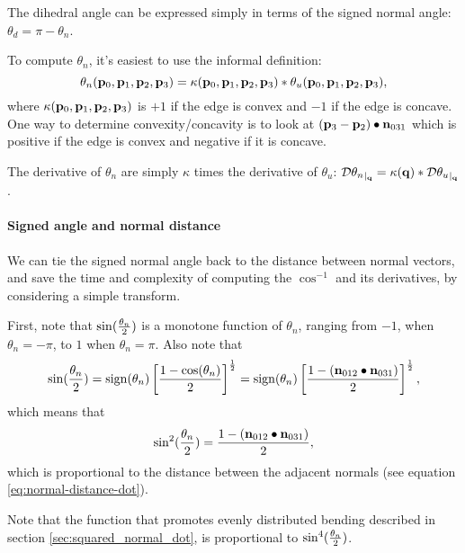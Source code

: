 The dihedral angle can be expressed simply in terms of the
signed normal angle: $\theta_d = \pi - \theta_n$.

To compute $\theta_n$,
it's easiest to use the informal definition:
\begin{equation}
\theta_n({\mathbf p}_0,{\mathbf p}_1,{\mathbf p}_2,{\mathbf p}_3)
= \kappa({\mathbf p}_0,{\mathbf p}_1,{\mathbf p}_2,{\mathbf p}_3) \ast \theta_u({\mathbf p}_0,{\mathbf p}_1,{\mathbf p}_2,{\mathbf p}_3),
\end{equation}
where $\kappa({\mathbf p}_0,{\mathbf p}_1,{\mathbf p}_2,{\mathbf p}_3)$ is
$+1$ if the edge is convex
and
$-1$ if the edge is concave.
One way to determine convexity/concavity
is to look at
$\left({\mathbf p}_3 - {\mathbf p}_2 \right) \bullet {\mathbf n}_{031}$
which is positive if the edge is convex
and negative if it is concave.

The derivative of $\theta_n$ are simply $\kappa$
times the derivative of $\theta_u$:
${\mathcal{D}{\theta_n}_{\mid_{{\mathbf q}}}} = \kappa({\mathbf q}) \ast {\mathcal{D}{\theta_u}_{\mid_{{\mathbf q}}}}$.


\paragraph{Signed angle and normal distance}
\label{sec:Signed-angle-and-normal-distance}

We can tie the signed normal angle back 
to the distance between normal vectors,
and save the time and complexity
of computing the $\cos^{-1}$ and its derivatives,
by considering a simple transform.

First, note that $\sin({\theta_n \over 2})$
is a monotone function of $\theta_n$,
ranging from $-1$, when $\theta_n = -\pi$,
to $1$ when $\theta_n = \pi$.
Also note that 
\begin{equation}
\sin({\theta_n \over 2}) 
 = 
\mathrm{sign}(\theta_n) 
\left[ {1 - \cos(\theta_n)} 
\over 2 \right]^{1 \over 2}
 = 
\mathrm{sign}(\theta_n) 
\left[ {1 - \left( {\mathbf n}_{012}\bullet{\mathbf n}_{031} \right)} 
\over 2 \right]^{1 \over 2},
\end{equation}
which means that
\begin{equation}
\sin^2({\theta_n \over 2}) 
= {{1 - \left( {\mathbf n}_{012}\bullet{\mathbf n}_{031} \right)} \over 2},
\end{equation}
which is proportional to the distance between the adjacent normals
(see equation \ref{eq:normal-distance-dot}).

Note that the function that promotes evenly 
distributed bending described in section \ref{sec:squared_normal_dot},
is proportional to $\sin^4({\theta_n \over 2})$. 

